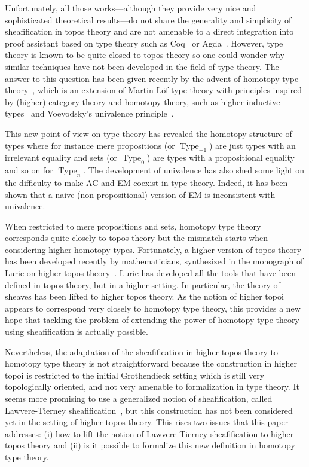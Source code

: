\documentclass[conference]{IEEEtran}
\DeclareMathOperator{\Type}{Type}
\begin{document}
Unfortunately, all those works---although they provide very nice and
sophisticated theoretical results---do not share the generality and
simplicity of sheafification in topos theory and are not amenable to a
direct integration into proof assistant based on type theory such as
Coq~\cite{coq:refman:8.4} or Agda~\cite{norell2007towards}.  
%
However, type theory is known to be quite closed to topos theory so
one could wonder why similar techniques have not been developed in the
field of type theory. 
%
The answer to this question has been given recently by the advent of
homotopy type theory~\cite{hottbook}, which is an extension of
Martin-Löf type theory with principles inspired by (higher) category
theory and homotopy theory, such as higher inductive
types~\cite{lumsdaine2011higher,lumsdaine2013higher} and
Voevodsky's univalence principle~\cite{kapulkin2012simplicial}. 
%

This new point of view on type theory has revealed the homotopy
structure of types where for instance mere propositions (or
$\Type_{-1}$) are just types with an
irrelevant equality and sets (or $\Type_{0}$) are types
with a propositional equality and so on for $\Type_{n}$.
%
The development of univalence has also shed some light on the
difficulty to make AC and EM coexist in type theory. Indeed, it
has been shown that a naive (non-propositional) version of EM is
inconsistent with univalence.

When restricted to mere propositions and sets, homotopy type
theory corresponds quite closely to topos theory but the mismatch
starts when considering higher homotopy types.
%
Fortunately, a higher version of topos theory has been developed
recently by mathematicians, synthesized in the monograph of Lurie on
higher topos theory~\cite{lurie}. 
%
Lurie has developed all the tools that have been defined in
topos theory, but in a higher setting. In particular, the theory of
sheaves has been lifted to higher topos theory.
%
As the notion of higher topoi appears to correspond very closely to
homotopy type theory, this provides a new hope that tackling the
problem of extending the power of homotopy type theory using
sheafification is actually possible.

Nevertheless, the adaptation of the sheafification in higher topos
theory to homotopy type theory is not straightforward because the
construction in higher topoi is restricted to the initial Grothendieck
setting which is still very topologically oriented, and not very
amenable to formalization in type theory. It seems more promising to
use a generalized notion of sheafification, called Lawvere-Tierney
sheafification~\cite{tierney1972sheaf,maclanemoerdijk}, but this construction has not
been considered yet in the setting of higher topos theory. This rises
two issues that this paper addresses: (i) how to lift the notion of
Lawvere-Tierney sheafification to higher topos theory and (ii) is it
possible to formalize this new definition in homotopy type theory.
\end{document}
